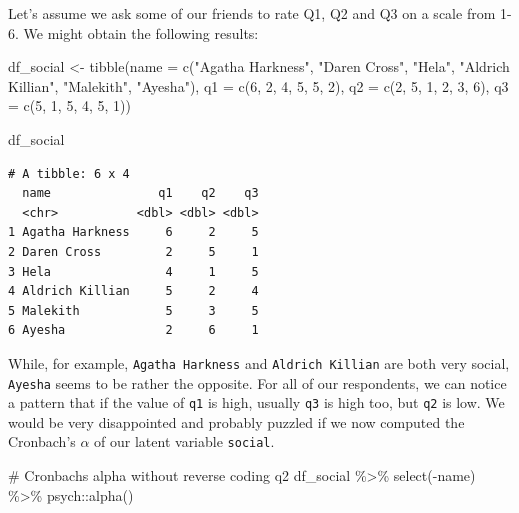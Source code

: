 \documentclass[
  letterpaper,
]{krantz}
\makeatletter
\newenvironment{Shaded}{\begin{snugshade}}{\end{snugshade}}
\newcommand{\AttributeTok}[1]{\textcolor[rgb]{0.40,0.45,0.13}{#1}}
\newcommand{\CommentTok}[1]{\textcolor[rgb]{0.37,0.37,0.37}{#1}}
\newcommand{\DecValTok}[1]{\textcolor[rgb]{0.68,0.00,0.00}{#1}}
\newcommand{\FunctionTok}[1]{\textcolor[rgb]{0.28,0.35,0.67}{#1}}
\newcommand{\NormalTok}[1]{\textcolor[rgb]{0.00,0.23,0.31}{#1}}
\newcommand{\OtherTok}[1]{\textcolor[rgb]{0.00,0.23,0.31}{#1}}
\newcommand{\SpecialCharTok}[1]{\textcolor[rgb]{0.37,0.37,0.37}{#1}}
\newcommand{\StringTok}[1]{\textcolor[rgb]{0.13,0.47,0.30}{#1}}
\newenvironment{kframe}{%
\medskip{}
\setlength{\fboxsep}{.8em}
 \def\at@end@of@kframe{}%
 \ifinner\ifhmode%
  \def\at@end@of@kframe{\end{minipage}}%
  \begin{minipage}{\columnwidth}%
 \fi\fi%
 \def\FrameCommand##1{\hskip\@totalleftmargin \hskip-\fboxsep
 \colorbox{shadecolor}{##1}\hskip-\fboxsep
     \hskip-\linewidth \hskip-\@totalleftmargin \hskip\columnwidth}%
 \MakeFramed {\advance\hsize-\width
   \@totalleftmargin\z@ \linewidth\hsize
   \@setminipage}}%
 {\par\unskip\endMakeFramed%
 \at@end@of@kframe}
\renewenvironment{Shaded}{\begin{kframe}}{\end{kframe}}
\makeatother
\begin{document}
Let's assume we ask some of our friends to rate Q1, Q2 and Q3 on a scale
from 1-6. We might obtain the following results:

\begin{Shaded}
\begin{Highlighting}[]
\NormalTok{df\_social }\OtherTok{\textless{}{-}} \FunctionTok{tibble}\NormalTok{(}\AttributeTok{name =} \FunctionTok{c}\NormalTok{(}\StringTok{"Agatha Harkness"}\NormalTok{, }\StringTok{"Daren Cross"}\NormalTok{, }\StringTok{"Hela"}\NormalTok{,}
                             \StringTok{"Aldrich Killian"}\NormalTok{, }\StringTok{"Malekith"}\NormalTok{, }\StringTok{"Ayesha"}\NormalTok{),}
                    \AttributeTok{q1 =} \FunctionTok{c}\NormalTok{(}\DecValTok{6}\NormalTok{, }\DecValTok{2}\NormalTok{, }\DecValTok{4}\NormalTok{, }\DecValTok{5}\NormalTok{, }\DecValTok{5}\NormalTok{, }\DecValTok{2}\NormalTok{),}
                    \AttributeTok{q2 =} \FunctionTok{c}\NormalTok{(}\DecValTok{2}\NormalTok{, }\DecValTok{5}\NormalTok{, }\DecValTok{1}\NormalTok{, }\DecValTok{2}\NormalTok{, }\DecValTok{3}\NormalTok{, }\DecValTok{6}\NormalTok{),}
                    \AttributeTok{q3 =} \FunctionTok{c}\NormalTok{(}\DecValTok{5}\NormalTok{, }\DecValTok{1}\NormalTok{, }\DecValTok{5}\NormalTok{, }\DecValTok{4}\NormalTok{, }\DecValTok{5}\NormalTok{, }\DecValTok{1}\NormalTok{))}

\NormalTok{df\_social}
\end{Highlighting}
\end{Shaded}

\begin{verbatim}
# A tibble: 6 x 4
  name               q1    q2    q3
  <chr>           <dbl> <dbl> <dbl>
1 Agatha Harkness     6     2     5
2 Daren Cross         2     5     1
3 Hela                4     1     5
4 Aldrich Killian     5     2     4
5 Malekith            5     3     5
6 Ayesha              2     6     1
\end{verbatim}

While, for example, \texttt{Agatha\ Harkness} and
\texttt{Aldrich\ Killian} are both very social, \texttt{Ayesha} seems to
be rather the opposite. For all of our respondents, we can notice a
pattern that if the value of \texttt{q1} is high, usually \texttt{q3} is
high too, but \texttt{q2} is low. We would be very disappointed and
probably puzzled if we now computed the Cronbach's \(\alpha\) of our
latent variable \texttt{social}.

\begin{Shaded}
\begin{Highlighting}[]
\CommentTok{\# Cronbach\textquotesingle{}s alpha without reverse coding q2}
\NormalTok{df\_social }\SpecialCharTok{\%\textgreater{}\%}
  \FunctionTok{select}\NormalTok{(}\SpecialCharTok{{-}}\NormalTok{name) }\SpecialCharTok{\%\textgreater{}\%}
\NormalTok{  psych}\SpecialCharTok{::}\FunctionTok{alpha}\NormalTok{()}
\end{Highlighting}
\end{Shaded}
\end{document}
